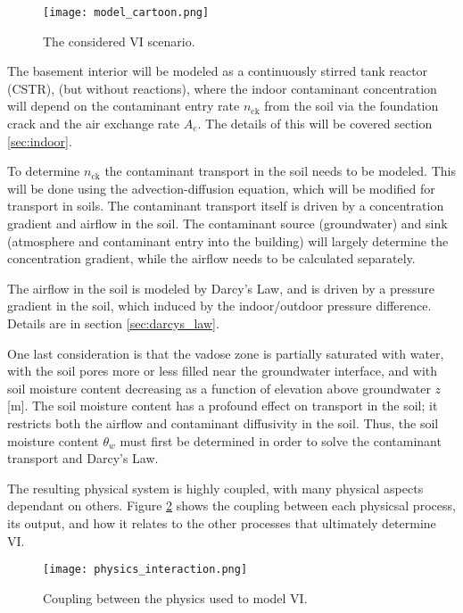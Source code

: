 \begin{figure}
  \texttt{[image: model\_cartoon.png]}
  \caption{The considered VI scenario.}
  \label{fig:vi_scenario}
\end{figure}

The basement interior will be modeled as a continuously stirred tank reactor (CSTR), (but without reactions), where the indoor contaminant concentration will depend on the contaminant entry rate $n_\mathrm{ck}$ from the soil via the foundation crack and the air exchange rate $A_e$.
The details of this will be covered section \ref{sec:indoor}.\par

To determine $n_\mathrm{ck}$ the contaminant transport in the soil needs to be modeled.
This will be done using the advection-diffusion equation, which will be modified for transport in soils.
The contaminant transport itself is driven by a concentration gradient and airflow in the soil.
The contaminant source (groundwater) and sink (atmosphere and contaminant entry into the building) will largely determine the concentration gradient, while the airflow needs to be calculated separately.\par

The airflow in the soil is modeled by Darcy's Law, and is driven by a pressure gradient in the soil, which induced by the indoor/outdoor pressure difference.
Details are in section \ref{sec:darcys_law}.\par

One last consideration is that the vadose zone is partially saturated with water, with the soil pores more or less filled near the groundwater interface, and with soil moisture content decreasing as a function of elevation above groundwater $z$ [\si{\metre}].
The soil moisture content has a profound effect on transport in the soil; it restricts both the airflow and contaminant diffusivity in the soil.
Thus, the soil moisture content $\theta_w$ must first be determined in order to solve the contaminant transport and Darcy's Law.\par

The resulting physical system is highly coupled, with many physical aspects dependant on others.
Figure \ref{fig:physics_overview} shows the coupling between each physicsal process, its output, and how it relates to the other processes that ultimately determine VI.\par

\begin{figure}
  \texttt{[image: physics\_interaction.png]}
  \caption{Coupling between the physics used to model VI.}
  \label{fig:physics_overview}
\end{figure}

